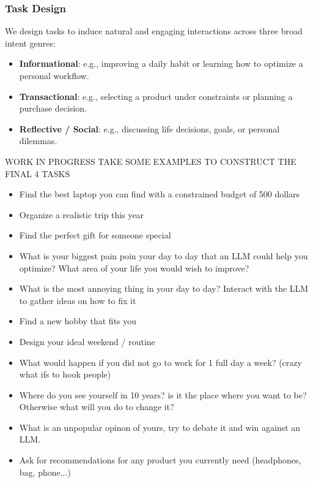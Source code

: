 \documentclass{article}
\begin{document}
\subsubsection{Task Design}

We design tasks to induce natural and engaging interactions across three broad intent genres:

\begin{itemize}
    \item \textbf{Informational}: e.g., improving a daily habit or learning how to optimize a personal workflow.
    
    \item \textbf{Transactional}: e.g., selecting a product under constraints or planning a purchase decision.
    
    \item \textbf{Reflective / Social}: e.g., discussing life decisions, goals, or personal dilemmas.
\end{itemize}

WORK IN PROGRESS TAKE SOME EXAMPLES TO CONSTRUCT THE FINAL 4 TASKS
\\ 
\begin{itemize}
    \item Find the best laptop you can find with a constrained budget of 500 dollars
    \item Organize a realistic trip this year 
    \item Find the perfect gift for someone special
    \item What is your biggest pain poin your day to day that an LLM could help you optimize? What area of your life you would wish to improve?
    \item What is the most annoying thing in your day to day? Interact with the LLM to gather ideas on how to fix it
    \item Find a new hobby that fits you
    \item Design your ideal weekend / routine
    \item What would happen if you did not go to work for 1 full day a week? (crazy what ifs to hook people)
    \item Where do you see yourself in 10 years? is it the place where you want to be? Otherwise what will you do to change it?
    \item What is an unpopular opinon of yours, try to debate it and win against an LLM.
    \item Ask for recommendations for any product you currently need (headphones, bag, phone...)
\end{itemize}
\end{document}
